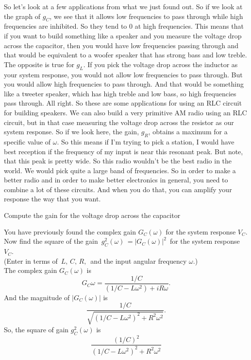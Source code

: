 So let's look at a few applications
from what we just found out.
So if we look at the graph of $g _C$,
we see that it allows low frequencies to pass through
while high frequencies are inhibited.
So they tend to $0$ at high frequencies.
This means that if you want to build something like a speaker
and you measure the voltage drop across the capacitor,
then you would have low frequencies passing through
and that would be equivalent to a woofer speaker that
has strong bass and low treble.
The opposite is true for $g _L$.
If you pick the voltage drop across the inductor
as your system response, you would not allow low frequencies
to pass through.
But you would allow high frequencies to pass through.
And that would be something like a tweeter speaker, which
has high treble and low bass, so high frequencies pass through.
All right.
So these are some applications for using an RLC circuit
for building speakers.
We can also build a very primitive AM radio
using an RLC circuit, but in that case
measuring the voltage drop across the resistor
as our system response.
So if we look here, the gain, $g _R$,
obtains a maximum for a specific value of $\omega$.
So this means if I'm trying to pick a station,
I would have best reception if the frequency of my input
is near this resonant peak.
But note, that this peak is pretty wide.
So this radio wouldn't be the best radio in the world.
We would pick quite a large band of frequencies.
So in order to make a better radio
and in order to make better electronics in general,
you need to combine a lot of these circuits.
And when you do that, you can amplify your response the way
that you want.
\clearpage

\begin{exercise}
  Compute the gain for the voltage drop across the capacitor 
\end{exercise}

You have previously found the complex gain $G _C(\omega)$
for the system response $V _C$. \\
Now find the square of the gain $\displaystyle \, g_ C^2(\omega )\, = \left|G_ C(\omega )\right|^2\,$
for the system response $V _C$. \\
(Enter in terms of $\, L,\, C,\, R,\,$  and the input angular frequency $\omega$.)\\

The complex gain $G _C (\omega)$ is 
\begin{equation*}
  G _C{\omega} = \frac{1/C}{(1/C - L\omega ^2) + iR \omega}.  
\end{equation*}
And the magnitude of $| G_ C(\omega ) |$ is
\begin{equation*}
  \frac{1/C}{\sqrt{(1/C - L\omega ^2) ^2 + R^2 \omega ^2}}.  
\end{equation*}
So, the square of gain $g_ C^2(\omega )$ is
\begin{equation*}
  \frac{(1/C)^2}{(1/C - L\omega ^2) ^2 + R^2 \omega ^2}
\end{equation*}

